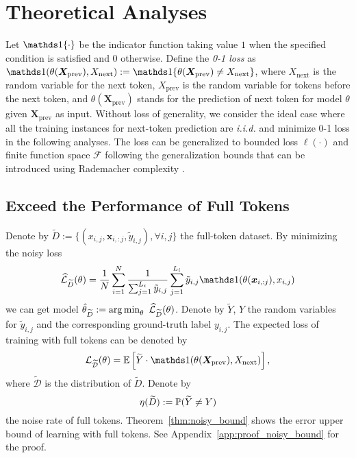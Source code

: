     






\section{Theoretical Analyses}\label{sec:thm_analyses}





Let $\BR\{\cdot\}$ be the indicator function taking value $1$ when the specified condition is satisfied and $0$ otherwise. Define the \emph{0-1 loss} as 
$\BR{(\theta(\bm X_{\text{prev}}), X_{\text{next}})}:=\BR\{\theta(\bm X_{\text{prev}}) \ne X_{\text{next}}\}$, where $X_{\text{next}}$ is the random variable for the next token, $X_{\text{prev}}$ is the random variable for tokens before the next token, and $\theta(\bm X_{\text{prev}})$ stands for the prediction of next token for model $\theta$ given $\bm X_{\text{prev}}$ as input.
Without loss of generality, we consider the ideal case where all the training instances for next-token prediction are \emph{i.i.d.} and minimize 0-1 loss in the following analyses. The loss can be generalized to bounded loss $\ell(\cdot)$ and finite function space $\mathcal F$ following the generalization bounds that can be introduced using Rademacher complexity \citep{bartlett2002rademacher}.

\subsection{Exceed the Performance of Full Tokens}

Denote by $\widetilde D:=\{(x_{i,j}, \bm x_{i,:j}, \tilde y_{i,j}), \forall i,j\}$ the full-token dataset.
By minimizing the noisy loss
$$
    \widehat {\mathcal{L}}_{\widetilde D}(\theta) = \frac{1}{N} \sum_{i=1}^N \frac{1}{\sum_{j=1}^{L_i} \tilde y_{i,j}} \sum_{j=1}^{L_i} \tilde y_{i,j} \BR( \theta (\bm x_{i,:j}), x_{i,j})
$$
we can get model $\hat \theta_{\widetilde D}:=\operatorname*{arg\,min}_{\theta}~  \widehat {\mathcal{L}}_{\widetilde D}(\theta)$. 
Denote by $\widetilde Y$, $Y$ the random variables for $\tilde y_{i,j}$ and the corresponding ground-truth label $y_{i,j}$.
The expected loss of training with full tokens can be denoted by 
$$
{\mathcal{L}}_{\widetilde {\mathcal D}}(\theta) = \E\left[ \widetilde Y \cdot \BR{(\theta(\bm X_{\text{prev}}), X_{\text{next}})}  \right],
$$
where $\widetilde {\mathcal D}$ is the distribution of $\widetilde D$. 
Denote by $$\eta(\widetilde D):=\mathbb P(\widetilde Y \ne Y)$$ the noise rate of full tokens. Theorem~\ref{thm:noisy_bound} shows the error upper bound of learning with full tokens. See Appendix~\ref{app:proof_noisy_bound} for the proof.



